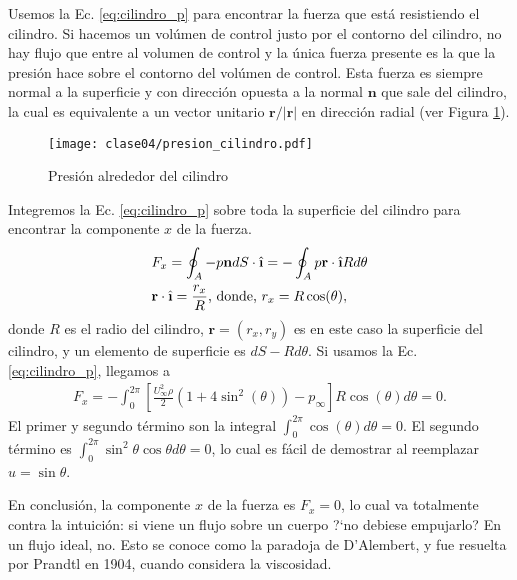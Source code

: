 Usemos la Ec. \eqref{eq:cilindro_p} para encontrar la fuerza que está resistiendo el cilindro.
Si hacemos un volúmen de control justo por el contorno del cilindro, no hay flujo que entre al volumen de control y la única fuerza presente es la que la presión hace sobre el contorno del volúmen de control.
Esta fuerza es siempre normal a la superficie y con dirección opuesta a la normal $\mathbf{n}$ que sale del cilindro, la cual es equivalente a un vector unitario $\mathbf{r}/|\mathbf{r}|$ en dirección radial (ver Figura \ref{fig:presion_cilindro}).
%
\begin{figure}[h!]
\centering
\texttt{[image: clase04/presion\_cilindro.pdf]}
\caption{Presión alrededor del cilindro}
\label{fig:presion_cilindro}
\end{figure}

Integremos la Ec. \eqref{eq:cilindro_p} sobre toda la superficie del cilindro para encontrar la componente $x$ de la fuerza.
%
\begin{align}\label{eq:fuerza_x}
&F_x = \oint_A -p\mathbf{n}dS\cdot\ihat = -\oint_A p\mathbf{r}\cdot\ihat Rd\theta \nonumber\\
&\mathbf{r}\cdot\ihat =\frac{r_x}{R} \text{, donde, } r_x = R\cos(\theta),
\end{align}
%
donde $R$ es el radio del cilindro, $\mathbf{r}=(r_x,r_y)$ es en este caso la superficie del cilindro, y un elemento de superficie es $dS-Rd\theta$.
Si usamos la Ec. \eqref{eq:cilindro_p}, llegamos a
%
\begin{align}
F_x = -\int_0^{2\pi}\left[\frac{U_\infty^2\rho}{2}(1+4\sin^2(\theta))-p_\infty\right]R\cos(\theta)d\theta=0.
\end{align}
El primer y segundo término son la integral $\int_0^{2\pi}\cos(\theta)d\theta=0$.
El segundo término es $\int_0^{2\pi}\sin^2\theta\cos\theta d\theta=0$, lo cual es fácil de demostrar al reemplazar $u=\sin\theta$.

En conclusión, la componente $x$ de la fuerza es $F_x=0$, lo cual va totalmente contra la intuición: si viene un flujo sobre un cuerpo \mbox{?`}no debiese empujarlo? En un flujo ideal, no.
Esto se conoce como la paradoja de D'Alembert, y fue resuelta por Prandtl en 1904, cuando considera la viscosidad. 

